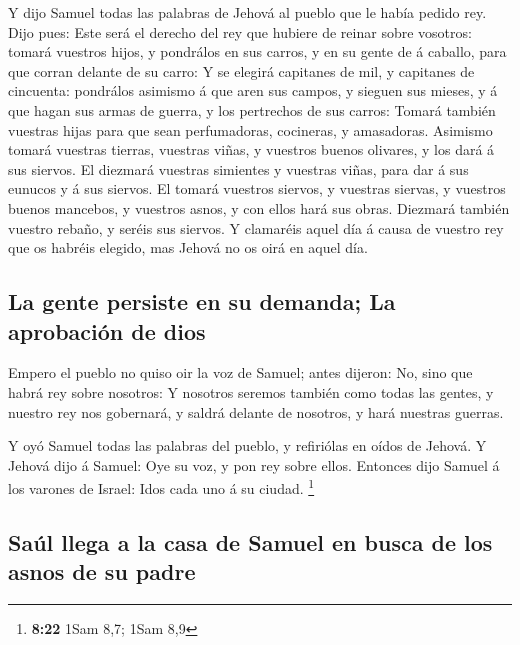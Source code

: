  Y dijo Samuel todas las palabras de Jehová al pueblo que
le había pedido rey.  Dijo pues: Este será el derecho del
rey que hubiere de reinar sobre vosotros: tomará vuestros hijos, y
pondrálos en sus carros, y en su gente de á caballo, para que corran
delante de su carro:  Y se elegirá capitanes de mil, y
capitanes de cincuenta: pondrálos asimismo á que aren sus campos, y
sieguen sus mieses, y á que hagan sus armas de guerra, y los pertrechos
de sus carros:  Tomará también vuestras hijas para que sean
perfumadoras, cocineras, y amasadoras.  Asimismo tomará
vuestras tierras, vuestras viñas, y vuestros buenos olivares, y los dará
á sus siervos.  El diezmará vuestras simientes y vuestras
viñas, para dar á sus eunucos y á sus siervos.  El tomará
vuestros siervos, y vuestras siervas, y vuestros buenos mancebos, y
vuestros asnos, y con ellos hará sus obras.  Diezmará
también vuestro rebaño, y seréis sus siervos.  Y clamaréis
aquel día á causa de vuestro rey que os habréis elegido, mas Jehová no
os oirá en aquel día.

\hypertarget{la-gente-persiste-en-su-demanda-la-aprobaciuxf3n-de-dios}{%
\subsection{La gente persiste en su demanda; La aprobación de
dios}\label{la-gente-persiste-en-su-demanda-la-aprobaciuxf3n-de-dios}}

 Empero el pueblo no quiso oir la voz de Samuel; antes
dijeron: No, sino que habrá rey sobre nosotros:  Y nosotros
seremos también como todas las gentes, y nuestro rey nos gobernará, y
saldrá delante de nosotros, y hará nuestras guerras.

 Y oyó Samuel todas las palabras del pueblo, y refiriólas
en oídos de Jehová.  Y Jehová dijo á Samuel: Oye su voz, y
pon rey sobre ellos. Entonces dijo Samuel á los varones de Israel: Idos
cada uno á su ciudad. \footnote{\textbf{8:22} 1Sam 8,7; 1Sam 8,9}

\hypertarget{sauxfal-llega-a-la-casa-de-samuel-en-busca-de-los-asnos-de-su-padre}{%
\subsection{Saúl llega a la casa de Samuel en busca de los asnos de su
padre}\label{sauxfal-llega-a-la-casa-de-samuel-en-busca-de-los-asnos-de-su-padre}}

